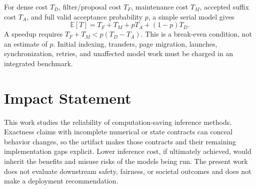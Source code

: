 \documentclass{article}
\theoremstyle{plain}
\theoremstyle{definition}
\theoremstyle{remark}
\begin{document}
For dense cost $T_D$, filter/proposal cost $T_F$, maintenance cost $T_M$,
accepted suffix cost $T_A$, and full valid acceptance probability $p$, a
simple serial model gives
\begin{equation}
 \mathbb E[T]=T_F+T_M+pT_A+(1-p)T_D.
 \label{eq:cost}
\end{equation}
A speedup requires $T_F+T_M<p(T_D-T_A)$. This is a break-even condition,
not an estimate of $p$. Initial indexing, transfers, page migration,
launches, synchronization, retries, and unaffected model work must be
charged in an integrated benchmark.

\section*{Impact Statement}
This work studies the reliability of computation-saving inference methods.
Exactness claims with incomplete numerical or state contracts can conceal
behavior changes, so the artifact makes those contracts and their remaining
implementation gaps explicit. Lower inference cost, if ultimately achieved,
would inherit the benefits and misuse risks of the models being run. The
present work does not evaluate downstream safety, fairness, or societal
outcomes and does not make a deployment recommendation.




\clearpage
\appendix
\onecolumn

\end{document}
